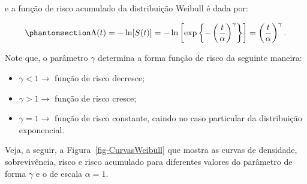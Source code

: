 \documentclass[
  12pt,
  letterpaper,
  DIV=11,
  numbers=noendperiod]{scrreprt}
\providecommand{\tightlist}{%
  \setlength{\itemsep}{0pt}\setlength{\parskip}{0pt}}\usepackage{longtable,booktabs,array}
\begin{document}
e a função de risco acumulado da distribuição Weibull é dada por:

\begin{equation}\phantomsection\label{eq-RiscAcumWeibull}{
\Lambda (t) = - \ln[S(t)] = - \ln \left[ \exp \left\{ - \left( \dfrac{t}{\alpha} \right)^{\gamma} \right\} \right] = \left( \dfrac{t}{\alpha} \right)^{\gamma}.
}\end{equation}

Note que, o parâmetro \(\gamma\) determina a forma função de risco da
seguinte maneira:

\begin{itemize}
\tightlist
\item
  \(\gamma < 1 \rightarrow\) função de risco decresce;
\item
  \(\gamma > 1 \rightarrow\) função de risco cresce;
\item
  \(\gamma = 1 \rightarrow\) função de risco constante, caindo no caso
  particular da distribuição exponencial.
\end{itemize}

Veja, a seguir, a Figura~\ref{fig-CurvasWeibull} que mostra as curvas de
densidade, sobrevivência, risco e risco acumulado para diferentes
valores do parâmetro de forma \(\gamma\) e o de escala \(\alpha = 1\).
\end{document}
